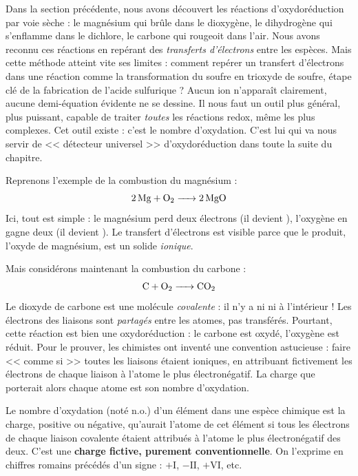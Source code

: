 \documentclass[11pt]{article}
\newcommand{\cle}[1]{{\popxbold\color{popdark}#1}}
\newcounter{popsec}
\newcounter{popsub}
\newcommand{\courssub}[1]{%
  \stepcounter{popsub}%
  \par\vspace{9pt}\noindent{\popxbold\fontsize{11.5}{13}\selectfont\color{popink}{\color{poporange}\thepopsec.\thepopsub}\hspace{6pt}#1}\par\nopagebreak\vspace{4pt}
}
\begin{document}
Dans la section précédente, nous avons découvert les réactions d'oxydoréduction par voie sèche : le magnésium qui brûle dans le dioxygène, le dihydrogène qui s'enflamme dans le dichlore, le carbone qui rougeoit dans l'air. Nous avons reconnu ces réactions en repérant des \emph{transferts d'électrons} entre les espèces. Mais cette méthode atteint vite ses limites : comment repérer un transfert d'électrons dans une réaction comme la transformation du soufre en trioxyde de soufre, étape clé de la fabrication de l'acide sulfurique ? Aucun ion n'apparaît clairement, aucune demi-équation évidente ne se dessine. Il nous faut un outil plus général, plus puissant, capable de traiter \emph{toutes} les réactions redox, même les plus complexes. Cet outil existe : c'est le \cle{nombre d'oxydation}. C'est lui qui va nous servir de << détecteur universel >> d'oxydoréduction dans toute la suite du chapitre.

\courssub{Pourquoi un nouvel outil ? L'idée intuitive}

Reprenons l'exemple de la combustion du magnésium :
\[ \ce{2Mg + O2 -> 2MgO} \]
Ici, tout est simple : le magnésium perd deux électrons (il devient ), l'oxygène en gagne deux (il devient ). Le transfert d'électrons est visible parce que le produit, l'oxyde de magnésium, est un solide \emph{ionique}.

Mais considérons maintenant la combustion du carbone :
\[ \ce{C + O2 -> CO2} \]
Le dioxyde de carbone est une molécule \emph{covalente} : il n'y a ni  ni  à l'intérieur ! Les électrons des liaisons sont \emph{partagés} entre les atomes, pas transférés. Pourtant, cette réaction est bien une oxydoréduction : le carbone est oxydé, l'oxygène est réduit. Pour le prouver, les chimistes ont inventé une convention astucieuse : faire << comme si >> toutes les liaisons étaient ioniques, en attribuant fictivement les électrons de chaque liaison à l'atome le plus électronégatif. La charge que porterait alors chaque atome est son nombre d'oxydation.

\begin{definition}
Le \cle{nombre d'oxydation} (noté n.o.) d'un élément dans une espèce chimique est la charge, positive ou négative, qu'aurait l'atome de cet élément si tous les électrons de chaque liaison covalente étaient attribués à l'atome le plus électronégatif des deux. C'est une \textbf{charge fictive, purement conventionnelle}. On l'exprime en chiffres romains précédés d'un signe : $+\mathrm{I}$, $-\mathrm{II}$, $+\mathrm{VI}$, etc.
\end{definition}
\end{document}
